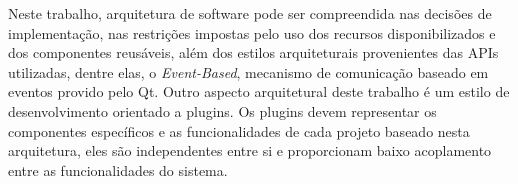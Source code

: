Neste trabalho, arquitetura de software pode ser compreendida nas decisões de implementação, nas restrições impostas pelo uso dos recursos disponibilizados e dos componentes reusáveis, além dos estilos arquiteturais provenientes das APIs utilizadas, dentre elas, o \textit{Event-Based}, mecanismo de comunicação baseado em eventos provido pelo Qt. Outro aspecto arquitetural deste trabalho é um estilo de desenvolvimento orientado a plugins. Os plugins devem representar os componentes específicos e as funcionalidades de cada projeto baseado nesta arquitetura, eles são independentes entre si e proporcionam baixo acoplamento entre as funcionalidades do sistema.







